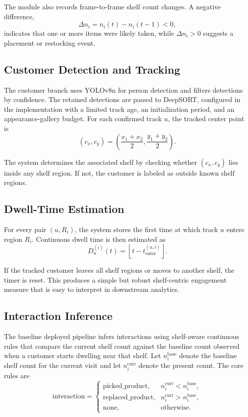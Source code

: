 \documentclass[conference]{IEEEtran}
\begin{document}
The module also records frame-to-frame shelf count changes. A negative difference,
\begin{equation}
\Delta n_i = n_i(t) - n_i(t-1) < 0,
\end{equation}
indicates that one or more items were likely taken, while $\Delta n_i > 0$ suggests a placement or restocking event.

\subsection{Customer Detection and Tracking}

The customer branch uses YOLOv8n for person detection and filters detections by confidence. The retained detections are passed to DeepSORT, configured in the implementation with a limited track age, an initialization period, and an appearance-gallery budget. For each confirmed track $u$, the tracked center point is
\begin{equation}
(c_x, c_y) = \left(\frac{x_1 + x_2}{2}, \frac{y_1 + y_2}{2}\right).
\end{equation}

The system determines the associated shelf by checking whether $(c_x, c_y)$ lies inside any shelf region. If not, the customer is labeled as outside known shelf regions.

\subsection{Dwell-Time Estimation}

For every pair $(u, R_i)$, the system stores the first time at which track $u$ enters region $R_i$. Continuous dwell time is then estimated as
\begin{equation}
D_u^{(i)}(t) = \left\lfloor t - t_{\mathrm{enter}}^{(u,i)} \right\rfloor.
\end{equation}

If the tracked customer leaves all shelf regions or moves to another shelf, the timer is reset. This produces a simple but robust shelf-centric engagement measure that is easy to interpret in downstream analytics.

\subsection{Interaction Inference}

The baseline deployed pipeline infers interactions using shelf-aware continuous rules that compare the current shelf count against the baseline count observed when a customer starts dwelling near that shelf. Let $n_i^{\mathrm{base}}$ denote the baseline shelf count for the current visit and let $n_i^{\mathrm{curr}}$ denote the present count. The core rules are
\begin{equation}
\text{interaction} =
\begin{cases}
\text{picked\_product}, & n_i^{\mathrm{curr}} < n_i^{\mathrm{base}},\\
\text{replaced\_product}, & n_i^{\mathrm{curr}} > n_i^{\mathrm{base}},\\
\text{none}, & \text{otherwise.}
\end{cases}
\end{equation}
\end{document}
